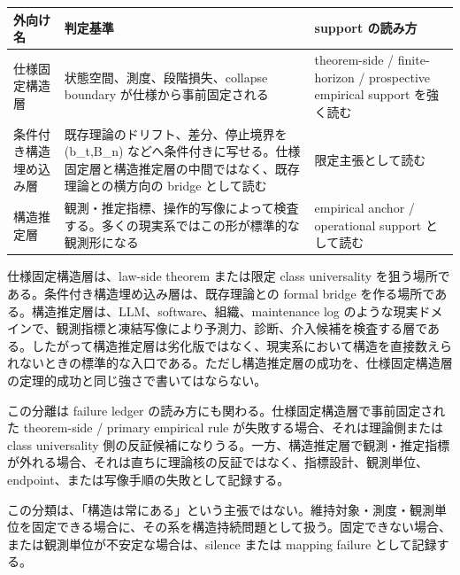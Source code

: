 \documentclass[12pt,a4paper]{article}
\begin{document}
{\def\LTcaptype{table} %
\begin{longtable}[]{@{}
  >{\raggedright\arraybackslash}p{}
  >{\raggedright\arraybackslash}p{}
  >{\raggedright\arraybackslash}p{}@{}}
\toprule\noalign{}
\begin{minipage}[b]{\linewidth}\raggedright
外向け名
\end{minipage} & \begin{minipage}[b]{\linewidth}\raggedright
判定基準
\end{minipage} & \begin{minipage}[b]{\linewidth}\raggedright
support の読み方
\end{minipage} \\
\midrule\noalign{}
\endhead
\bottomrule\noalign{}
\endlastfoot
仕様固定構造層 & 状態空間、測度、段階損失、collapse boundary が仕様から事前固定される & theorem-side / finite-horizon / prospective empirical support を強く読む \\
条件付き構造埋め込み層 & 既存理論のドリフト、差分、停止境界を (b\_t,B\_n) などへ条件付きに写せる。仕様固定層と構造推定層の中間ではなく、既存理論との横方向の bridge として読む & 限定主張として読む \\
構造推定層 & 観測・推定指標、操作的写像によって検査する。多くの現実系ではこの形が標準的な観測形になる & empirical anchor / operational support として読む \\
\end{longtable}
}

仕様固定構造層は、law-side theorem または限定 class universality を狙う場所である。条件付き構造埋め込み層は、既存理論との formal bridge を作る場所である。構造推定層は、LLM、software、組織、maintenance log のような現実ドメインで、観測指標と凍結写像により予測力、診断、介入候補を検査する層である。したがって構造推定層は劣化版ではなく、現実系において構造を直接数えられないときの標準的な入口である。ただし構造推定層の成功を、仕様固定構造層の定理的成功と同じ強さで書いてはならない。

この分離は failure ledger の読み方にも関わる。仕様固定構造層で事前固定された theorem-side / primary empirical rule が失敗する場合、それは理論側または class universality 側の反証候補になりうる。一方、構造推定層で観測・推定指標が外れる場合、それは直ちに理論核の反証ではなく、指標設計、観測単位、endpoint、または写像手順の失敗として記録する。

この分類は、「構造は常にある」という主張ではない。維持対象・測度・観測単位を固定できる場合に、その系を構造持続問題として扱う。固定できない場合、または観測単位が不安定な場合は、silence または mapping failure として記録する。
\end{document}
